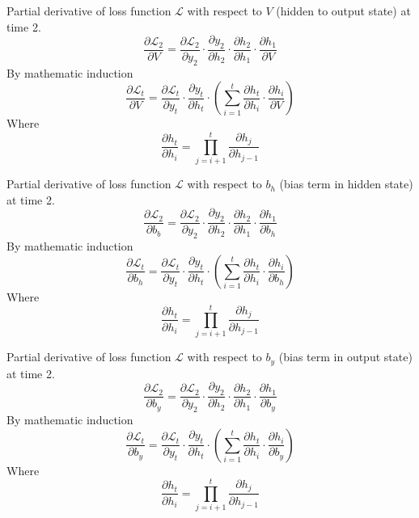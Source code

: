 \documentclass[12pt,a4paper]{article}
\begin{document}
Partial derivative of loss function $\mathcal{L}$ with respect to $V$ (hidden to output state) at time 2.\\
\begin{equation}
    \dfrac{\partial\mathcal{L}_2}{\partial V} = \dfrac{\partial\mathcal{L}_2}{\partial y_2} \cdot \dfrac{\partial y_2}{\partial h_2} \cdot \dfrac{\partial h_2}{\partial h_1} \cdot \dfrac{\partial h_1}{\partial V}
\end{equation}
By mathematic induction 
\begin{equation}
    \dfrac{\partial\mathcal{L}_t}{\partial V} = \dfrac{\partial\mathcal{L}_t}{\partial y_t} \cdot \dfrac{\partial y_t}{\partial h_t} \cdot (\sum_{i=1}^{t} \dfrac{\partial h_t}{\partial h_i} \cdot \dfrac{\partial h_i}{\partial V})
\end{equation}
Where 
\begin{equation}
    \dfrac{\partial h_t}{\partial h_i} = \prod_{j=i+1}^{t} \dfrac{\partial h_j}{\partial h_{j-1}}
\end{equation}

Partial derivative of loss function $\mathcal{L}$ with respect to $b_h$ (bias term in hidden state) at time 2.\\
\begin{equation}
    \dfrac{\partial\mathcal{L}_2}{\partial b_b} = \dfrac{\partial\mathcal{L}_2}{\partial y_2} \cdot \dfrac{\partial y_2}{\partial h_2} \cdot \dfrac{\partial h_2}{\partial h_1} \cdot \dfrac{\partial h_1}{\partial b_h}
\end{equation}
By mathematic induction 
\begin{equation}
    \dfrac{\partial\mathcal{L}_t}{\partial b_h} = \dfrac{\partial\mathcal{L}_t}{\partial y_t} \cdot \dfrac{\partial y_t}{\partial h_t} \cdot (\sum_{i=1}^{t} \dfrac{\partial h_t}{\partial h_i} \cdot \dfrac{\partial h_i}{\partial b_h})
\end{equation}
Where 
\begin{equation}
    \dfrac{\partial h_t}{\partial h_i} = \prod_{j=i+1}^{t} \dfrac{\partial h_j}{\partial h_{j-1}}
\end{equation}

Partial derivative of loss function $\mathcal{L}$ with respect to $b_y$ (bias term in output state) at time 2.
\begin{equation}
    \dfrac{\partial\mathcal{L}_2}{\partial b_y} = \dfrac{\partial\mathcal{L}_2}{\partial y_2} \cdot \dfrac{\partial y_2}{\partial h_2} \cdot \dfrac{\partial h_2}{\partial h_1} \cdot \dfrac{\partial h_1}{\partial b_y}
\end{equation}
By mathematic induction 
\begin{equation}
    \dfrac{\partial\mathcal{L}_t}{\partial b_y} = \dfrac{\partial\mathcal{L}_t}{\partial y_t} \cdot \dfrac{\partial y_t}{\partial h_t} \cdot (\sum_{i=1}^{t} \dfrac{\partial h_t}{\partial h_i} \cdot \dfrac{\partial h_i}{\partial b_y})
\end{equation}
Where 
\begin{equation}
    \dfrac{\partial h_t}{\partial h_i} = \prod_{j=i+1}^{t} \dfrac{\partial h_j}{\partial h_{j-1}}
\end{equation}
\end{document}
